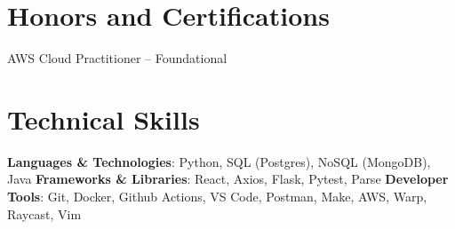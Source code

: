 \documentclass{article}%
\begin{document}
%
\section{Honors and Certifications}%
\label{sec:HonorsandCertifications}%
AWS Cloud Practitioner – Foundational

%
\section{Technical Skills}%
\label{sec:TechnicalSkills}%
\textbf{Languages \& Technologies}: Python, SQL (Postgres), NoSQL (MongoDB), Java%
\newline%
\textbf{Frameworks \& Libraries}: React, Axios, Flask, Pytest, Parse%
\newline%
\textbf{Developer Tools}: Git, Docker, Github Actions, VS Code, Postman, Make, AWS, Warp, Raycast, Vim

%
\end{document}
